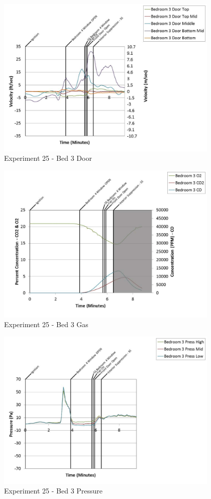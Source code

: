 \documentclass{article}
\begin{document}
\begin{appendices}
	\begin{figure}[h!]
		\centering
		\includegraphics[height=3.05in]{0_Images/Results_Charts/Exp_25_Charts/Bed3Door.pdf}
		\caption{Experiment 25 - Bed 3 Door}
	\end{figure}
 
	\clearpage

	\begin{figure}[h!]
		\centering
		\includegraphics[height=3.05in]{0_Images/Results_Charts/Exp_25_Charts/Bed3Gas.pdf}
		\caption{Experiment 25 - Bed 3 Gas}
	\end{figure}
 

	\begin{figure}[h!]
		\centering
		\includegraphics[height=3.05in]{0_Images/Results_Charts/Exp_25_Charts/Bed3Pressure.pdf}
		\caption{Experiment 25 - Bed 3 Pressure}
	\end{figure}
 

\end{appendices}
\end{document}
